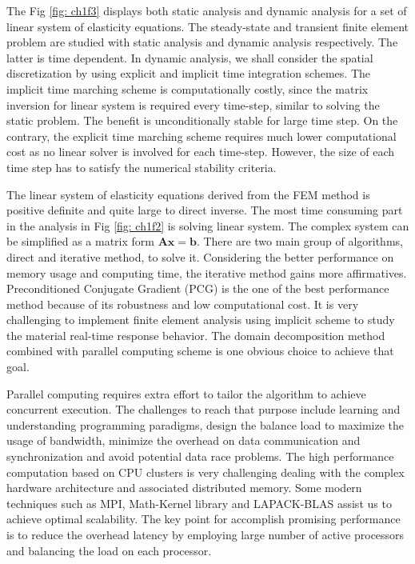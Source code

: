 The Fig \ref{fig: ch1f3} displays both static analysis and dynamic analysis for a set of linear system of elasticity equations. The steady-state and transient finite element problem are studied with static analysis and dynamic analysis respectively. The latter is time dependent. In dynamic analysis, we shall consider the spatial discretization by using explicit and implicit time integration schemes\cite{bathe2008finite}. The implicit time marching scheme is computationally costly, since the matrix inversion for linear system is required every time-step, similar to solving the static problem. The benefit is unconditionally stable for large time step. On the contrary, the explicit time marching scheme requires much lower computational cost as no linear solver is involved for each time-step. However, the size of each time step has to satisfy the numerical stability criteria. 


The linear system of elasticity equations derived from the FEM method is positive definite and quite large to direct inverse. The most time consuming part in the analysis in Fig \ref{fig: ch1f2} is solving linear system. The complex system can be simplified as a matrix form $ \mathbf{A} \mathbf{x} = \mathbf{b} $. There are two main group of algorithms, direct and iterative method, to solve it. Considering the better performance on memory usage and computing time, the iterative method gains more affirmatives\cite{brussino1989comparison}. Preconditioned Conjugate Gradient (PCG) is the one of the best performance method because of its robustness and low computational cost. It is very challenging to implement finite element analysis using implicit scheme to study the material real-time response behavior. The domain decomposition method combined with parallel computing scheme is one obvious choice to achieve that goal.

Parallel computing requires extra effort to tailor the algorithm to achieve concurrent execution. The challenges to reach that purpose include learning and understanding programming paradigms, design the balance load to maximize the usage of bandwidth, minimize the overhead on data communication and synchronization and avoid potential data race problems. The high performance computation based on CPU clusters is very challenging dealing with the complex hardware architecture and associated distributed memory. Some modern techniques such as MPI, Math-Kernel library and LAPACK-BLAS assist us to achieve optimal scalability. The key point for accomplish promising performance is to reduce the overhead latency by employing large number of active processors and balancing the load on each processor.

